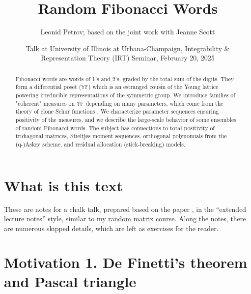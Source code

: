 \documentclass[letterpaper,11pt,oneside,reqno]{article}
\numberwithin{equation}{section}
\theoremstyle{definition}
\begin{document}
\title{Random Fibonacci Words}


\author{Leonid Petrov; based on the joint work with Jeanne Scott \cite{PetrovScott2024Fibonacci}}

\date{Talk at University of Illinois at Urbana-Champaign, Integrability \& Representation Theory (IRT) Seminar, February 20, 2025}


\maketitle

\begin{abstract}
	Fibonacci words are words of 1's and 2's, graded by the total sum of the digits. They form a differential poset ($\mathbb{YF}$) which is an estranged cousin of the Young lattice powering irreducible representations of the symmetric group. We introduce families of "coherent" measures on $\mathbb{YF}$ depending on many parameters, which come from the theory of clone Schur functions \cite{okada1994algebras}. We characterize parameter sequences ensuring positivity of the measures, and we describe the large-scale behavior of some ensembles of random Fibonacci words. The subject has connections to total positivity of tridiagonal matrices, Stieltjes moment sequences, orthogonal polynomials from the (q-)Askey scheme, and residual allocation (stick-breaking) models.
\end{abstract}

\section*{What is this text}

These are notes for a chalk talk, prepared based on the paper
\cite{PetrovScott2024Fibonacci}, in the ``extended lecture notes''
style, similar to my \href{https://lpetrov.cc/rmt25/}{random matrix course}.
Along the notes, there are numerous skipped details,
which are left as exercises for the reader.

\setcounter{tocdepth}{1}
\tableofcontents
\setcounter{tocdepth}{3}

\section{Motivation 1. De Finetti's theorem and Pascal triangle}

\subsection{}
\end{document}
